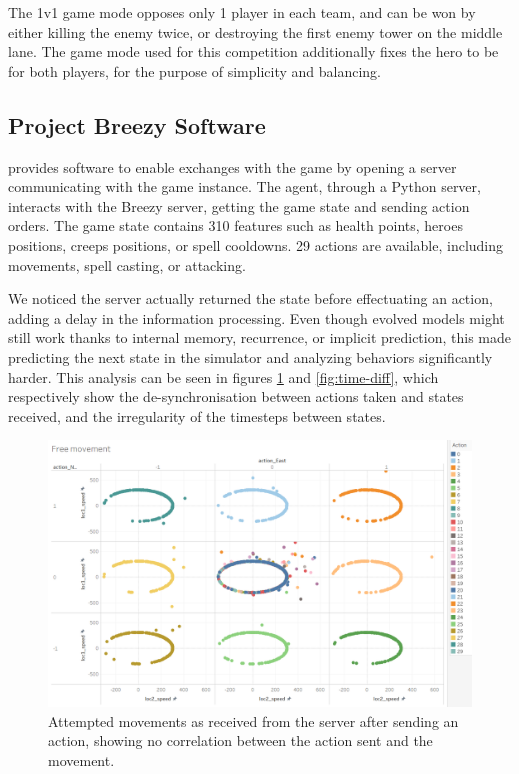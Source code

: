 The 1v1 game mode opposes only 1 player in each team, and can be won by either killing the enemy twice, or destroying the first enemy tower on the middle lane. The game mode used for this competition additionally fixes the hero to be  for both players, for the purpose of simplicity and balancing.

\subsection{Project Breezy Software}
 provides software to enable exchanges with the \dota game by opening a server communicating with the game instance. The agent, through a Python server, interacts with the Breezy server, getting the game state and sending action orders. The game state contains 310 features such as health points, heroes positions, creeps positions, or spell cooldowns. 29 actions are available, including movements, spell casting, or attacking.

We noticed the server actually returned the state before effectuating an action, adding a delay in the information processing. Even though evolved models might still work thanks to internal memory, recurrence, or implicit prediction, this made predicting the next state in the simulator and analyzing behaviors significantly harder. This analysis can be seen in figures \ref{fig:movement} and \ref{fig:time-diff}, which respectively show the de-synchronisation between actions taken and states received, and the irregularity of the timesteps between states.

\begin{figure}[H]
 \centering
 \captionsetup{justification=centering, margin=0.5cm}
 \includegraphics[width=14cm]{images/movement_dota.PNG}
\caption{Attempted movements as received from the server after sending an action, showing no correlation between the action sent and the movement.}
 \label{fig:movement}
\end{figure}

